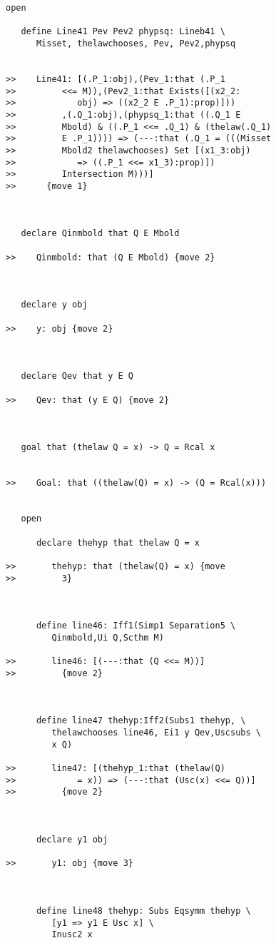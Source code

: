 \documentclass[12pt]{article}
\begin{document}
\begin{verbatim}
open

   define Line41 Pev Pev2 phypsq: Lineb41 \
      Misset, thelawchooses, Pev, Pev2,phypsq


>>    Line41: [(.P_1:obj),(Pev_1:that (.P_1
>>         <<= M)),(Pev2_1:that Exists([(x2_2:
>>            obj) => ((x2_2 E .P_1):prop)]))
>>         ,(.Q_1:obj),(phypsq_1:that ((.Q_1 E
>>         Mbold) & ((.P_1 <<= .Q_1) & (thelaw(.Q_1)
>>         E .P_1)))) => (---:that (.Q_1 = (((Misset
>>         Mbold2 thelawchooses) Set [(x1_3:obj)
>>            => ((.P_1 <<= x1_3):prop)])
>>         Intersection M)))]
>>      {move 1}



   declare Qinmbold that Q E Mbold

>>    Qinmbold: that (Q E Mbold) {move 2}



   declare y obj

>>    y: obj {move 2}



   declare Qev that y E Q

>>    Qev: that (y E Q) {move 2}



   goal that (thelaw Q = x) -> Q = Rcal x


>>    Goal: that ((thelaw(Q) = x) -> (Q = Rcal(x)))


   open

      declare thehyp that thelaw Q = x

>>       thehyp: that (thelaw(Q) = x) {move
>>         3}



      define line46: Iff1(Simp1 Separation5 \
         Qinmbold,Ui Q,Scthm M)

>>       line46: [(---:that (Q <<= M))]
>>         {move 2}



      define line47 thehyp:Iff2(Subs1 thehyp, \
         thelawchooses line46, Ei1 y Qev,Uscsubs \
         x Q)

>>       line47: [(thehyp_1:that (thelaw(Q)
>>            = x)) => (---:that (Usc(x) <<= Q))]
>>         {move 2}



      declare y1 obj

>>       y1: obj {move 3}



      define line48 thehyp: Subs Eqsymm thehyp \
         [y1 => y1 E Usc x] \
         Inusc2 x


\end{verbatim}
\end{document}
